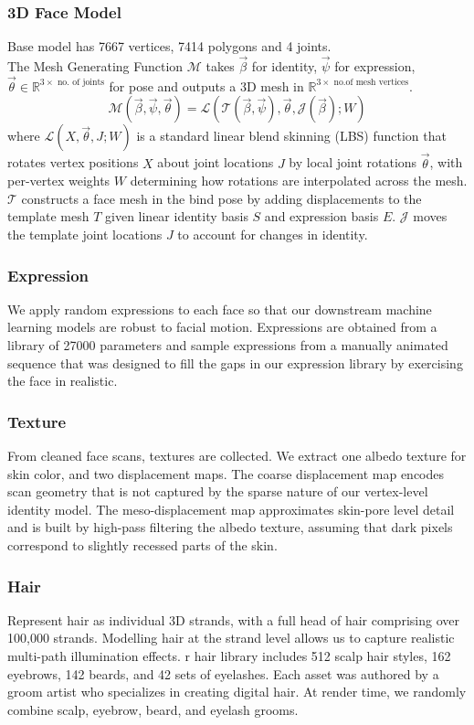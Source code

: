 \documentclass[12pt]{article}
\begin{document}
\subsubsection{3D Face Model}
Base model has 7667 vertices, 7414 polygons and 4 joints.\\
The Mesh Generating Function $\mathcal{M}$ takes $\vec{\beta}$ for identity, $\vec{\psi}$ for expression, $\vec{\theta}\in \mathbb{R}^{3\times \text{ no. of joints}}$ for pose and outputs a 3D mesh in $\mathbb{R}^{3\times\text{ no.of mesh vertices}}$.
\[\mathcal{M}(\vec{\beta},\vec{\psi},\vec{\theta})=\mathcal{L}(\mathcal{T}(\vec{\beta},\vec{\psi}),\vec{\theta},\mathcal{J}(\vec{\beta});W)\]
where $\mathcal{L}(X,\vec{\theta}, J;W)$ is a standard linear blend skinning
(LBS) function that rotates vertex positions $X$ about joint locations $J$ by local joint rotations $\vec{\theta}$,
with per-vertex weights $W$ determining how rotations are interpolated across the mesh. $\mathcal{T}$ constructs a face mesh in the bind pose by adding
displacements to the template mesh $T$ given linear identity basis $S$ and expression
basis $E$. $\mathcal{J}$ moves the template joint locations $J$ to account for changes in identity.
\subsubsection{Expression}
We apply random expressions to each face so that our
downstream machine learning models are robust to facial motion. Expressions are obtained from a library of 27000 parameters and sample expressions from a manually animated sequence that was designed to fill the gaps in
our expression library by exercising the face in realistic.
\subsubsection{Texture}
From cleaned face scans, textures are collected. We extract one
albedo texture for skin color, and two displacement maps. The coarse displacement map encodes scan
geometry that is not captured by the sparse nature of our
vertex-level identity model. The meso-displacement map
approximates skin-pore level detail and is built by high-pass
filtering the albedo texture, assuming that dark pixels correspond to slightly recessed parts of the skin.
\subsubsection{Hair}
Represent hair as
individual 3D strands, with a full head of hair comprising
over 100,000 strands. Modelling hair at the strand level
allows us to capture realistic multi-path illumination effects. r hair library includes 512 scalp hair
styles, 162 eyebrows, 142 beards, and 42 sets of eyelashes.
Each asset was authored by a groom artist who specializes in
creating digital hair. At render time, we randomly combine
scalp, eyebrow, beard, and eyelash grooms.
\end{document}
